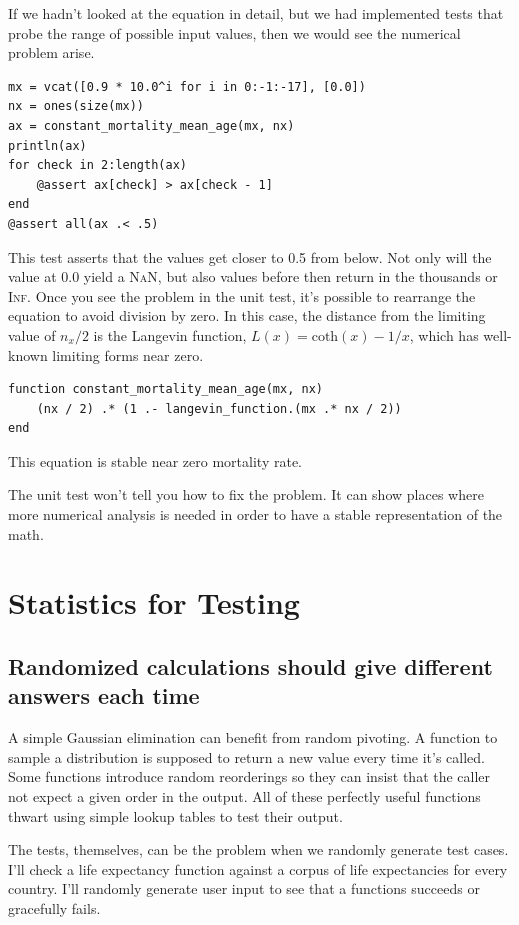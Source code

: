 \documentclass[fleqn,10pt]{olplainarticle}
\newcommand{\nan}{\textsc{NaN}\xspace}
\begin{document}
If we hadn't looked at the equation in detail, but we had implemented
tests that probe the range of possible input values, then
we would see the numerical problem arise.
\begin{lstlisting}
mx = vcat([0.9 * 10.0^i for i in 0:-1:-17], [0.0])
nx = ones(size(mx))
ax = constant_mortality_mean_age(mx, nx)
println(ax)
for check in 2:length(ax)
    @assert ax[check] > ax[check - 1]
end
@assert all(ax .< .5)
\end{lstlisting}
This test asserts that the values get closer to 0.5 from below.
Not only will the value at 0.0 yield a \nan, but also
values before then return in the thousands or \textsc{Inf}.
Once you see the problem in the unit test, it's possible
to rearrange the equation to avoid
division by zero. In this case, the distance from the limiting
value of $n_x/2$ is the Langevin function, $L(x) = \mbox{coth}(x) - 1/x$,
which has well-known limiting forms near zero.
\begin{lstlisting}
function constant_mortality_mean_age(mx, nx)
    (nx / 2) .* (1 .- langevin_function.(mx .* nx / 2))
end
\end{lstlisting}
This equation is stable near zero mortality rate.

The unit test won't tell you how to fix the problem.
It can show places where more numerical analysis is
needed in order to have a stable representation of the math.


\section{Statistics for Testing}\label{sec:statistical}

\subsection{Randomized calculations should give different answers each time}

A simple Gaussian elimination can benefit from random pivoting.
A function to sample a distribution is supposed to return a new value
every time it's called.
Some functions introduce random reorderings
so they can insist that the caller not expect a given order
in the output. All of these perfectly useful functions
thwart using simple lookup tables to test their output.

The tests, themselves, can be the problem when we randomly
generate test cases. I'll check
a life expectancy function against a corpus of life expectancies
for every country. I'll randomly generate user input
to see that a functions succeeds or gracefully fails.
\end{document}
